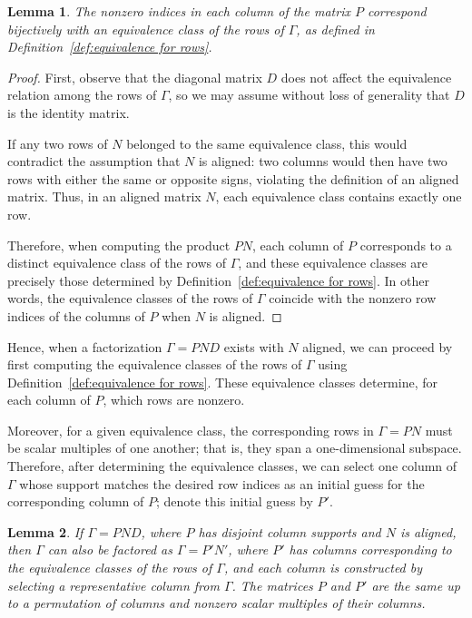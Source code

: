 \documentclass{article}
\newtheorem{lem}{Lemma}
\begin{document}
\begin{lem}
\label{lem:equivalence of row relation matrices}
The nonzero indices in each column of the matrix \( P \) correspond bijectively with an equivalence class of the rows of \( \Gamma \), as defined in Definition~\ref{def:equivalence for rows}.
\end{lem}

\begin{proof}
First, observe that the diagonal matrix \( D \) does not affect the equivalence relation among the rows of \( \Gamma \), so we may assume without loss of generality that \( D \) is the identity matrix.

If any two rows of \( N \) belonged to the same equivalence class, this would contradict the assumption that \( N \) is aligned: two columns would then have two rows with either the same or opposite signs, violating the definition of an aligned matrix. Thus, in an aligned matrix \( N \), each equivalence class contains exactly one row.

Therefore, when computing the product \( PN \), each column of \( P \) corresponds to a distinct equivalence class of the rows of \( \Gamma \), and these equivalence classes are precisely those determined by Definition~\ref{def:equivalence for rows}. In other words, the equivalence classes of the rows of \( \Gamma \) coincide with the nonzero row indices of the columns of \( P \) when \( N \) is aligned.
\end{proof}

Hence, when a factorization \( \Gamma = PND \) exists with \( N \) aligned, we can proceed by first computing the equivalence classes of the rows of \( \Gamma \) using Definition~\ref{def:equivalence for rows}. These equivalence classes determine, for each column of \( P \), which rows are nonzero.

Moreover, for a given equivalence class, the corresponding rows in \( \Gamma = PN \) must be scalar multiples of one another; that is, they span a one-dimensional subspace. Therefore, after determining the equivalence classes, we can select one column of \( \Gamma \) whose support matches the desired row indices as an initial guess for the corresponding column of \( P \); denote this initial guess by \( P' \).


\begin{lem}
If \( \Gamma = PND \), where \( P \) has disjoint column supports and \( N \) is aligned, then \( \Gamma \) can also be factored as \( \Gamma = P'N' \), where \( P' \) has columns corresponding to the equivalence classes of the rows of \( \Gamma \), and each column is constructed by selecting a representative column from \( \Gamma \). The matrices \( P \) and \( P' \) are the same up to a permutation of columns and nonzero scalar multiples of their columns.
\end{lem}
\end{document}
